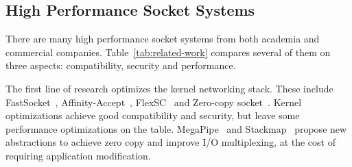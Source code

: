 




\subsection{High Performance Socket Systems}
\label{subsec:related-work}


There are many high performance socket systems from both academia and commercial companies.
Table~\ref{tab:related-work} compares several of them on three aspects: compatibility, security and performance.  

The first line of research optimizes the kernel networking stack. These include FastSocket~\cite{lin2016scalable}, Affinity-Accept~\cite{pesterev2012improving}, FlexSC~\cite{soares2010flexsc} and Zero-copy socket~\cite{thadani1995efficient,chu1996zero}.
Kernel optimizations achieve good compatibility and security, but leave some performance optimizations on the table.
MegaPipe~\cite{han2012megapipe} and Stackmap~\cite{yasukata2016stackmap} propose new abstractions to achieve zero copy and improve I/O multiplexing, at the cost of requiring application modification.

